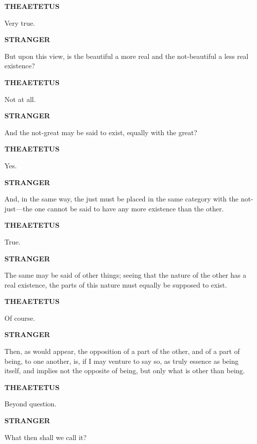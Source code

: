\documentclass[11pt,letter]{article}
\begin{document}
\par \textbf{THEAETETUS}
\par   Very true.

\par \textbf{STRANGER}
\par   But upon this view, is the beautiful a more real and the not-beautiful a less real existence?

\par \textbf{THEAETETUS}
\par   Not at all.

\par \textbf{STRANGER}
\par   And the not-great may be said to exist, equally with the great?

\par \textbf{THEAETETUS}
\par   Yes.

\par \textbf{STRANGER}
\par   And, in the same way, the just must be placed in the same category with the not-just—the one cannot be said to have any more existence than the other.

\par \textbf{THEAETETUS}
\par   True.

\par \textbf{STRANGER}
\par   The same may be said of other things; seeing that the nature of the other has a real existence, the parts of this nature must equally be supposed to exist.

\par \textbf{THEAETETUS}
\par   Of course.

\par \textbf{STRANGER}
\par   Then, as would appear, the opposition of a part of the other, and of a part of being, to one another, is, if I may venture to say so, as truly essence as being itself, and implies not the opposite of being, but only what is other than being.

\par \textbf{THEAETETUS}
\par   Beyond question.

\par \textbf{STRANGER}
\par   What then shall we call it?
\end{document}
